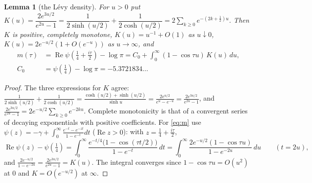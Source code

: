 \documentclass[11pt]{amsart}
\newtheorem{lemma}[theorem]{Lemma}
\theoremstyle{definition}
\theoremstyle{remark}
\newcommand{\Rel}{\operatorname{Re}}
\begin{document}
\begin{lemma}[the L\'evy density]\label{lem:K}
For $u>0$ put $K(u)=\dfrac{2e^{3u/2}}{e^{2u}-1}=\dfrac{1}{2\sinh(u/2)}+\dfrac{1}{2\cosh(u/2)}
=2\sum_{k\ge0}e^{-(2k+\frac12)u}$. Then $K$ is positive, completely monotone,
$K(u)=u^{-1}+O(1)$ as $u\downarrow0$, $K(u)=2e^{-u/2}(1+O(e^{-u}))$ as $u\to\infty$, and
\begin{equation}\label{eq:m}
\begin{split}
m(\tau)&=\Rel\psi\!\left(\tfrac14+\tfrac{i\tau}2\right)-\log\pi
= C_0+\int_0^\infty(1-\cos\tau u)\,K(u)\,du,\\
C_0&=\psi(\tfrac14)-\log\pi=-5.3721834\ldots
\end{split}
\end{equation}
\end{lemma}
\begin{proof}
The three expressions for $K$ agree: $\frac{1}{2\sinh(u/2)}+\frac1{2\cosh(u/2)}
=\frac{\cosh(u/2)+\sinh(u/2)}{\sinh u}=\frac{2e^{u/2}}{e^u-e^{-u}}=\frac{2e^{3u/2}}{e^{2u}-1}$, and
$\frac{2e^{3u/2}}{e^{2u}-1}=2e^{-u/2}\sum_{k\ge0}e^{-2ku}$. Complete monotonicity is that of a
convergent series of decaying exponentials with positive coefficients. For \eqref{eq:m} use
$\psi(z)=-\gamma+\int_0^\infty\frac{e^{-t}-e^{-zt}}{1-e^{-t}}dt$ ($\Rel z>0$): with $z=\frac14+\frac{i\tau}2$,
\[
\Rel\psi(z)-\psi(\tfrac14)=\int_0^\infty\frac{e^{-t/4}\big(1-\cos(\tau t/2)\big)}{1-e^{-t}}\,dt
=\int_0^\infty\frac{2e^{-u/2}(1-\cos\tau u)}{1-e^{-2u}}\,du\qquad(t=2u),
\]
and $\frac{2e^{-u/2}}{1-e^{-2u}}=\frac{2e^{3u/2}}{e^{2u}-1}=K(u)$. The integral converges since
$1-\cos\tau u=O(u^2)$ at $0$ and $K=O(e^{-u/2})$ at $\infty$.
\end{proof}
\end{document}
